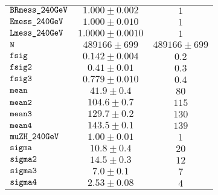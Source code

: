 \begin{tabular}{lcc}
$\verb+BRmess_240GeV+ $ & $  1.000\pm 0.002$ & $ 1$\\
$\verb+Emess_240GeV+ $ & $  1.000\pm 0.010$ & $ 1$\\
$\verb+Lmess_240GeV+ $ & $  1.0000\pm 0.0010$ & $ 1$\\
$\verb+N+ $ & $  489166\pm 699$ & $ 489166\pm 699$\\
$\verb+fsig+ $ & $  0.142\pm 0.004$ & $ 0.2$\\
$\verb+fsig2+ $ & $  0.41\pm 0.01$ & $ 0.3$\\
$\verb+fsig3+ $ & $  0.779\pm 0.010$ & $ 0.4$\\
$\verb+mean+ $ & $  41.9\pm 0.4$ & $ 80$\\
$\verb+mean2+ $ & $  104.6\pm 0.7$ & $ 115$\\
$\verb+mean3+ $ & $  129.7\pm 0.2$ & $ 130$\\
$\verb+mean4+ $ & $  143.5\pm 0.1$ & $ 139$\\
$\verb+muZH_240GeV+ $ & $  1.00\pm 0.01$ & $ 1$\\
$\verb+sigma+ $ & $  10.8\pm 0.4$ & $ 20$\\
$\verb+sigma2+ $ & $  14.5\pm 0.3$ & $ 12$\\
$\verb+sigma3+ $ & $  7.0\pm 0.1$ & $ 7$\\
$\verb+sigma4+ $ & $  2.53\pm 0.08$ & $ 4$\\
\end{tabular}
